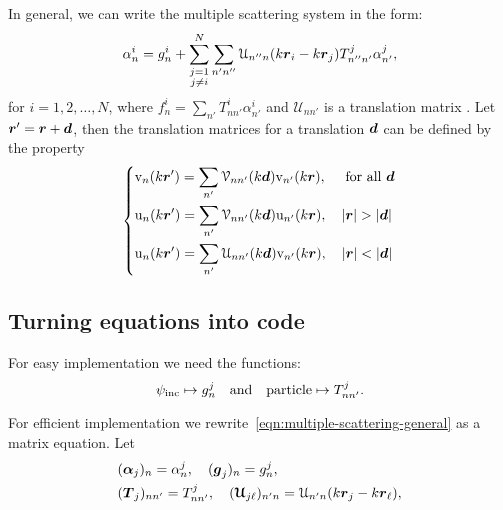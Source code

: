 \documentclass[ 12pt, a4paper]{article}
\renewcommand{\vec}[1]{\boldsymbol{#1}}
\begin{document}
In general, we can write the multiple scattering system in the form:
\begin{equation}\label{eqn:multiple-scattering-general}
   \alpha_n^i=g_{n}^i
    +\sum_{\substack{j=1\\j\neq i}}^N \sum_{n' n''}\mathcal{U}_{n''n}(k\rv_i - k\rv_j)T_{n''n'}^j \alpha_{n'}^j,
\end{equation}
for $i=1,2,\ldots,N$, where $f_n^i = \sum_{n'} T^i_{nn'}\alpha_{n'}^i$ and $\mathcal{U}_{nn'}$ is a translation matrix \cite{Bostrom+Kristensson+Strom1991,Friedman+Russek1954}. Let $\rv'=\rv+\dv$, then
the translation matrices for a translation $\dv$ can be defined by the property~\cite{Bostrom+Kristensson+Strom1991}
  \begin{equation}\label{eq:translation_spherical_waves}
 \left\{\begin{aligned}
   &\mathrm{v}_n(k\rv')=\sum_{n'}\mathcal{V}_{nn'}(k\dv)\mathrm{v}_{n'}(k\rv),\quad \text{ for all }\dv
   \\
 &\mathrm{u}_n(k\rv')=\sum_{n'}\mathcal{V}_{nn'}(k\dv)\mathrm{u}_{n'}(k\rv),\quad |\rv|>|\dv|
 \\
   &\mathrm{u}_n(k\rv')=\sum_{n'}\mathcal{U}_{nn'}(k\dv)\mathrm{v}_{n'}(k\rv),\quad |\rv|<|\dv|
   \\
 \end{aligned}\right.
 \end{equation}

\subsection{Turning equations into code}
For easy implementation we need the functions:
\[
\psi_{\mathrm{inc}} \mapsto g_n^j \quad \text{and} \quad \text{particle} \mapsto T_{nn'}^j.
\]

For efficient implementation we rewrite~\eqref{eqn:multiple-scattering-general} as a matrix equation. Let
\begin{align}
  &(\vec \alpha_j)_n =  \alpha_n^j, \quad (\vec g_j)_n =  g_n^j,
  \\
  &(\vec T_j)_{nn'} = T_{nn'}^j, \quad (\vec {\mathcal U}_{j \ell})_{n'n} = \mathcal U_{n'n}(k \rv_j - k\rv_\ell),
\end{align}
\end{document}
